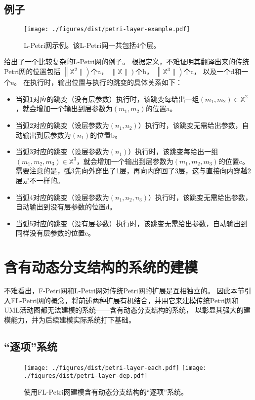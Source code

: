 \documentclass[index]{subfiles}
\begin{document}
\subsection{例子}
\begin{figure}[h]
  \centering
  \texttt{[image: ./figures/dist/petri-layer-example.pdf]}
  \caption[L-Petri网示例]{L-Petri网示例。该L-Petri网一共包括4个层。\label{fig:petri-layer}}
\end{figure}

给出了一个比较复杂的L-Petri网的例子。
根据定义，不难证明其翻译出来的传统Petri网的位置包括
$\left\|\mathbb{X}^{2}\|\right)$个a，
$\left\|\mathbb{X}\|\right)$个b，
$\left\|\mathbb{X}^{3}\|\right)$个c，
以及一个d和一个e。
在执行时，输出位置与执行的跳变的具体关系如下：
\begin{itemize}
  \item 当弧1对应的跳变（没有层参数）执行时，该跳变每给出一组$(m_1,m_2)\in\mathbb{X}^{2}$，就会增加一个输出到层参数为$(m_1,m_2)$的位置a。
  \item 当弧2对应的跳变（设层参数为$(n_1,n_2)$）执行时，该跳变无需给出参数，自动输出到层参数为$(n_1)$的位置b。
  \item 当弧3对应的跳变（设层参数为$(n_1)$）执行时，该跳变每给出一组$(m_1,m_2,m_3)\in\mathbb{X}^{3}$，就会增加一个输出到层参数为$(m_1,m_2,m_3)$的位置c。
    需要注意的是，弧3先向外穿出了1层，再向内穿回了3层，这与直接向内穿越2层是不一样的。
  \item 当弧4对应的跳变（设层参数为$(n_1,n_2,n_3)$）执行时，该跳变无需给出参数，自动输出到没有层参数的位置d。
  \item 当弧5对应的跳变（没有层参数）执行时，该跳变无需给出参数，自动输出到同样没有层参数的位置e。
\end{itemize}

\section{含有动态分支结构的系统的建模}
不难看出，F-Petri网和L-Petri网对传统Petri网的扩展是互相独立的。
因此本节引入FL-Petri网的概念，将前述两种扩展有机结合，并用它来建模传统Petri网和UML活动图都无法建模的系统——含有动态分支结构的系统，
以彰显其强大的建模能力，并为后续建模实际系统打下基础。

\subsection{“逐项”系统}
\begin{figure}[h]
  \centering%
    {\texttt{[image: ./figures/dist/petri-layer-each.pdf]}}
  \hspace{1em}
    {\texttt{[image: ./figures/dist/petri-layer-dep.pdf]}}
  \caption[FL-Petri建模“逐项”系统]{使用FL-Petri网建模含有动态分支结构的“逐项”系统。}
\end{figure}
\end{document}
